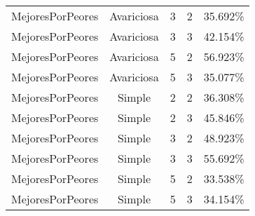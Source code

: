 \begin{center}
\begin{tabular}{cccc|c}
MejoresPorPeores & Avariciosa & 3 & 2 & 35.692\% \\
MejoresPorPeores & Avariciosa & 3 & 3 & 42.154\% \\
MejoresPorPeores & Avariciosa & 5 & 2 & 56.923\% \\
MejoresPorPeores & Avariciosa & 5 & 3 & 35.077\% \\
MejoresPorPeores & Simple & 2 & 2 & 36.308\% \\
MejoresPorPeores & Simple & 2 & 3 & 45.846\% \\
MejoresPorPeores & Simple & 3 & 2 & 48.923\% \\
MejoresPorPeores & Simple & 3 & 3 & 55.692\% \\
MejoresPorPeores & Simple & 5 & 2 & 33.538\% \\
MejoresPorPeores & Simple & 5 & 3 & 34.154\% \\
\end{tabular}
\end{center}
